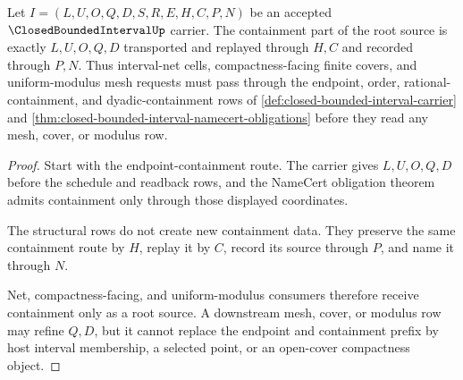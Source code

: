 \begin{theorem}
\label{thm:closed-bounded-interval-root-containment-split}
Let $I=(L,U,O,Q,D,S,R,E,H,C,P,N)$ be an accepted $\ClosedBoundedIntervalUp$ carrier. The containment part of the root source is exactly $L,U,O,Q,D$ transported and replayed through $H,C$ and recorded through $P,N$. Thus interval-net cells, compactness-facing finite covers, and uniform-modulus mesh requests must pass through the endpoint, order, rational-containment, and dyadic-containment rows of \autoref{def:closed-bounded-interval-carrier} and \autoref{thm:closed-bounded-interval-namecert-obligations} before they read any mesh, cover, or modulus row.
\end{theorem}
\begin{proof}
Start with the endpoint-containment route. The carrier gives $L,U,O,Q,D$ before the schedule and readback rows, and the NameCert obligation theorem admits containment only through those displayed coordinates.

The structural rows do not create new containment data. They preserve the same containment route by $H$, replay it by $C$, record its source through $P$, and name it through $N$.

Net, compactness-facing, and uniform-modulus consumers therefore receive containment only as a root source. A downstream mesh, cover, or modulus row may refine $Q,D$, but it cannot replace the endpoint and containment prefix by host interval membership, a selected point, or an open-cover compactness object.
\end{proof}

